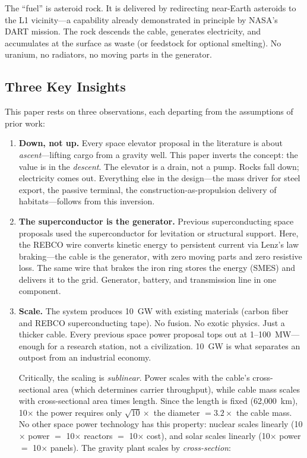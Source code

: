 \documentclass[12pt,letterpaper]{article}
\begin{document}
The ``fuel'' is asteroid rock. It is delivered by redirecting near-Earth asteroids to the L1 vicinity---a capability already demonstrated in principle by NASA's DART mission. The rock descends the cable, generates electricity, and accumulates at the surface as waste (or feedstock for optional smelting). No uranium, no radiators, no moving parts in the generator.

\subsection{Three Key Insights}

This paper rests on three observations, each departing from the assumptions of prior work:

\begin{enumerate}[label=\arabic*.]
\item \textbf{Down, not up.} Every space elevator proposal in the literature is about \emph{ascent}---lifting cargo from a gravity well. This paper inverts the concept: the value is in the \emph{descent}. The elevator is a drain, not a pump. Rocks fall down; electricity comes out. Everything else in the design---the mass driver for steel export, the passive terminal, the construction-as-propulsion delivery of habitats---follows from this inversion.

\item \textbf{The superconductor is the generator.} Previous superconducting space proposals used the superconductor for levitation or structural support. Here, the REBCO wire converts kinetic energy to persistent current via Lenz's law braking---the cable is the generator, with zero moving parts and zero resistive loss. The same wire that brakes the iron ring stores the energy (SMES) and delivers it to the grid. Generator, battery, and transmission line in one component.

\item \textbf{Scale.} The system produces 10~GW with existing materials (carbon fiber and REBCO superconducting tape). No fusion. No exotic physics. Just a thicker cable. Every previous space power proposal tops out at 1--100~MW---enough for a research station, not a civilization. 10~GW is what separates an outpost from an industrial economy.

Critically, the scaling is \emph{sublinear}. Power scales with the cable's cross-sectional area (which determines carrier throughput), while cable mass scales with cross-sectional area times length. Since the length is fixed (62,000~km), 10$\times$ the power requires only $\sqrt{10}\times$ the diameter $= 3.2\times$ the cable mass. No other space power technology has this property: nuclear scales linearly (10$\times$ power $=$ 10$\times$ reactors $=$ 10$\times$ cost), and solar scales linearly (10$\times$ power $=$ 10$\times$ panels). The gravity plant scales by \emph{cross-section}:


\end{enumerate}
\end{document}
